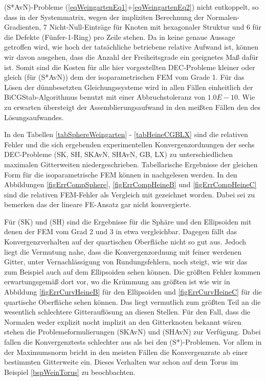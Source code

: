   (S*AvN)-Probleme (\eqref{eqWeingartenEq1}+\eqref{eqWeingartenEq2}) nicht entkoppelt, so dass in der
  Systemmatrix, wegen der impliziten Berechnung der Normalen-Gradienten, 7 Nicht-Null-Einträge für Knoten
  mit hexagonaler Struktur und 6 für die Defekte (Fünfer-1-Ring) pro Zeile stehen.
  Da in \cite{heine} keine genaue Aussage getroffen wird, wie hoch der tatsächliche betriebene relative Aufwand ist,
  können wir davon ausgehen, dass die Anzahl der Freiheitsgrade ein geeignetes Maß dafür ist.
  Somit sind die Kosten für alle hier vorgestellten DEC-Probleme kleiner oder gleich (für (S*AvN)) dem der
  isoparametrischen FEM vom Grade 1.
  Für das Lösen der dünnbesetzten Gleichungssysteme wird in allen Fällen einheitlich der
  BiCGStab-Algorithmus benutzt mit einer Abbruchstoleranz von \( 1.0E-10 \).
  Wie zu erwarten übersteigt der Assemblierungsaufwand in den meißten Fällen den des Lösungsaufwandes.

  In den Tabellen \ref{tabSphereWeingarten} - \ref{tabHeineCGBLX} sind die relativen Fehler 
  und die sich ergebenden experimentellen Konvergenzordnungen der sechs
  DEC-Probleme (SK, SH, SKAvN, SHAvN, GB, LX) zu unterschiedlichen maximalen Gitterweiten niedergeschrieben.
  Tabellarische Ergebnisse der gleichen Form für die isoparametrische FEM können in \cite{heine} nachgelesen werden.
  In den Abbildungen \ref{figErrCompSphere}, \ref{figErrCompHeineB} und \ref{figErrCompHeineC} sind die
  relativen FEM-Fehler als Vergleich mit gezeichnet worden.
  Dabei sei zu bemerken das der lineare FE-Ansatz gar nicht konvergierte.

  Für (SK) und (SH) sind die Ergebnisse für die Sphäre und den Ellipsoiden mit denen der FEM vom Grad 2 und
  3 in etwa vergleichbar. 
  Dagegen fällt das Konvergenzverhalten auf der quartischen Oberfläche nicht so gut aus.
  Jedoch liegt die Vermutung nahe, dass die Konvergenzordnung mit feiner werdenen Gitter, unter
  Vernachlässigung von Rundungsfehlern, noch steigt, wie
  wir das zum Beispiel auch auf dem Ellipsoiden sehen können.
  Die größten Fehler kommen erwartungsgemäß dort vor, wo die Krümmung am größten ist wie wir in Abbildung
  \ref{figErrCurvHeineB} für den Ellipsoiden und \ref{figErrCurvHeineC} für die quartische Oberfläche sehen
  können.
  Das liegt vermutlich zum größten Teil an die wesentlich schlechtere Gitterauflösung an diesen Stellen.
  Für den Fall, dass die Normalen weder explizit nocht implizit an den Gitterknoten bekannt wären stehen
  die Problemeformulierungen (SKAvN) und (SHAvN) zur Verfügung.
  Dabei fallen die Konvergenztests schlechter aus als bei den (S*)-Problemen.
  Vor allem in der Maximumsnorm bricht in den meisten Fällen die Konvergenzrate ab einer bestimmten
  Gitterweite ein.
  Dieses Verhalten war schon auf dem Torus im Beispiel \ref{bspWeinTorus} zu beochbachten.
  
